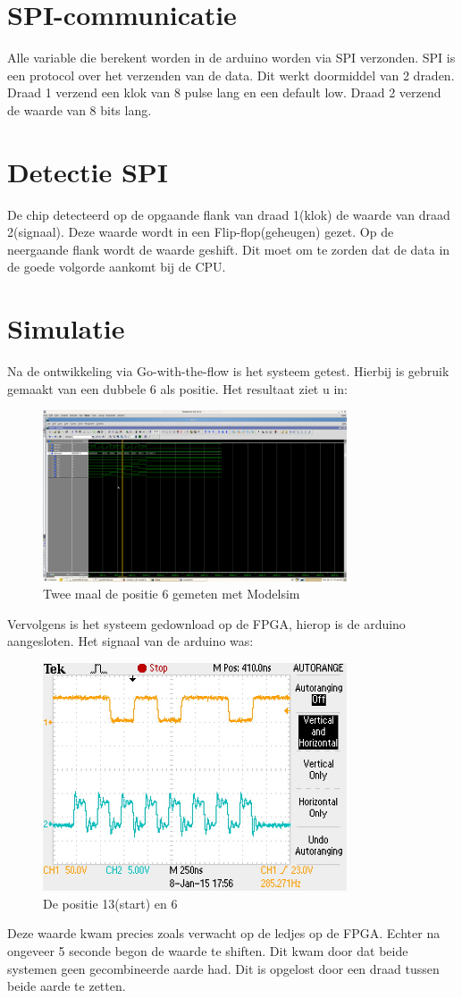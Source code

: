 \documentclass[oneside,dutch]{tudelft-report}
\begin{document}
\section{SPI-communicatie}
Alle variable die berekent worden in de arduino worden via SPI verzonden. SPI is een protocol over het verzenden van de data. Dit werkt doormiddel van 2 draden. Draad 1 verzend een klok van 8 pulse lang en een default low. Draad 2 verzend de waarde van 8 bits lang.

\section{Detectie SPI}
De chip detecteerd op de opgaande flank van draad 1(klok) de waarde van draad 2(signaal). Deze waarde wordt in een Flip-flop(geheugen) gezet. Op de neergaande flank wordt de waarde geshift. Dit moet om te zorden dat de data in de goede volgorde aankomt bij de CPU.

\section{Simulatie}
Na de ontwikkeling via Go-with-the-flow is het systeem getest. Hierbij is gebruik gemaakt van een dubbele 6 als positie. Het resultaat ziet u in: 
\begin{figure}[H]
\center
\includegraphics[width=9cm]{Screenshot.png}
\caption{Twee maal de positie 6 gemeten met Modelsim}
\label{CPU}
\end{figure}

Vervolgens is het systeem gedownload op de FPGA, hierop is de arduino aangesloten. Het signaal van de arduino was:
\begin{figure}[H]
\center
\includegraphics[width=9cm]{TEK0001.JPG}
\caption{De positie 13(start) en 6}
\label{CPU}
\end{figure}
Deze waarde kwam precies zoals verwacht op de ledjes op de FPGA. Echter na ongeveer 5 seconde begon de waarde te shiften. Dit kwam door dat beide systemen geen gecombineerde aarde had. Dit is opgelost door een draad tussen beide aarde te zetten.
\end{document}
